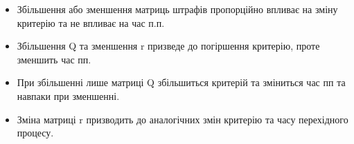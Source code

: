\documentclass[a4paper]{article}
\begin{document}
\begin{itemize}
  \item Збільшення або зменшення матриць штрафів пропорційно впливає на
зміну критерію та не впливає на час п.п.
  \item Збільшення Q та зменшення r призведе до погіршення критерію, проте
зменшить час пп.
  \item При збільшенні лише матриці Q збільшиться критерій та зміниться час
пп та навпаки при зменшенні.
  \item Зміна матриці r призводить до аналогічних змін критерію та часу
перехідного процесу.
\end{itemize}

\newpage
 
\end{document}
